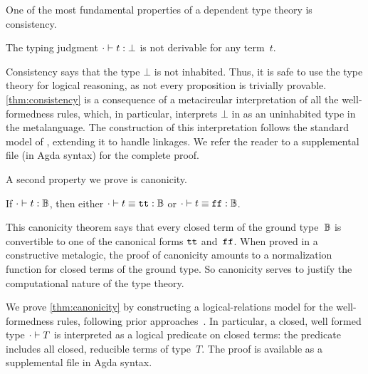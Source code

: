 One of the most fundamental properties of a dependent type theory is consistency.
\begin{theorem}[Consistency]
\label{thm:consistency}
  The typing judgment $ {\cdot} \vdash {t} : {\bot} $ is not derivable for any term~$t$.
\end{theorem}

\noindent
Consistency says that the type $\bot$ is not inhabited.
Thus, it is safe to use the type theory for logical reasoning, as not
every proposition is trivially provable.
\cref{thm:consistency} is a consequence of a meta\-circular interpretation of all
the well-formedness rules, which, in particular, interprets $\bot$ in
\TT as an uninhabited type in the meta\-language.
The construction of this interpretation follows the standard model of
\citet{altkap2016}, extending it to handle linkages.
We refer the reader to a supplemental file (in Agda syntax) for the complete proof.


A second property we prove is canonicity.

\begin{theorem}[Canonicity]
\label{thm:canonicity}
  If $ {\cdot} \vdash {t} : {\mathbb{B}} $, then either $ {\cdot} \vdash {t \equiv \ensuremath{\texttt{tt}}} : {\mathbb{B}} $ or $ {\cdot} \vdash {t \equiv \ensuremath{\texttt{ff}}} : {\mathbb{B}} $.
\end{theorem}

\noindent
This canonicity theorem says that every closed term of the ground
type~$\mathbb{B}$ is convertible to one of the canonical forms $\texttt{tt}$ and~$\texttt{ff}$.
When proved in a constructive meta\-logic, the proof of canonicity
amounts to a normalization function for closed terms of the ground type.
So canonicity serves to justify the computational nature of the type theory.

We prove \cref{thm:canonicity} by constructing a logical-relations model
for the well-formedness rules, following prior approaches~\cite{coquand2018canonicity,sterling2019algebraic,kaposi2019gluing}.
In particular, a closed, well formed type $ {\cdot} \vdash {T} $ is interpreted
as a logical predicate on closed terms: the predicate includes all
closed, reducible terms of type~$T$.
The proof is available as a supplemental file in Agda syntax.